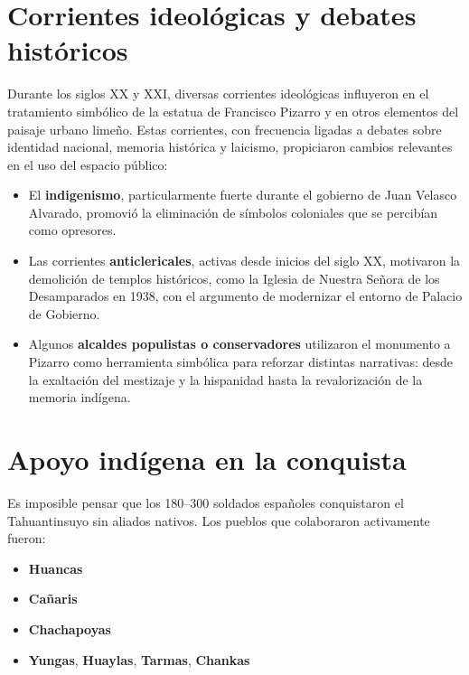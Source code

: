\documentclass[a4paper,12pt]{article}
\begin{document}
	
	
\section{Corrientes ideológicas y debates históricos}

Durante los siglos XX y XXI, diversas corrientes ideológicas influyeron en el tratamiento simbólico de la estatua de Francisco Pizarro y en otros elementos del paisaje urbano limeño. Estas corrientes, con frecuencia ligadas a debates sobre identidad nacional, memoria histórica y laicismo, propiciaron cambios relevantes en el uso del espacio público:

\begin{itemize}
	\item El \textbf{indigenismo}, particularmente fuerte durante el gobierno de Juan Velasco Alvarado, promovió la eliminación de símbolos coloniales que se percibían como opresores.
	
	\item Las corrientes \textbf{anticlericales}, activas desde inicios del siglo XX, motivaron la demolición de templos históricos, como la Iglesia de Nuestra Señora de los Desamparados en 1938, con el argumento de modernizar el entorno de Palacio de Gobierno.
	
	\item Algunos \textbf{alcaldes populistas o conservadores} utilizaron el monumento a Pizarro como herramienta simbólica para reforzar distintas narrativas: desde la exaltación del mestizaje y la hispanidad hasta la revalorización de la memoria indígena.
\end{itemize}

\clearpage	
\section{Apoyo indígena en la conquista}

Es imposible pensar que los 180–300 soldados españoles conquistaron el Tahuantinsuyo sin aliados nativos. Los pueblos que colaboraron activamente fueron:

\begin{itemize}
	\item \textbf{Huancas}
	\item \textbf{Cañaris}
	\item \textbf{Chachapoyas}
	\item \textbf{Yungas}, \textbf{Huaylas}, \textbf{Tarmas}, \textbf{Chankas}
\end{itemize}
\end{document}
